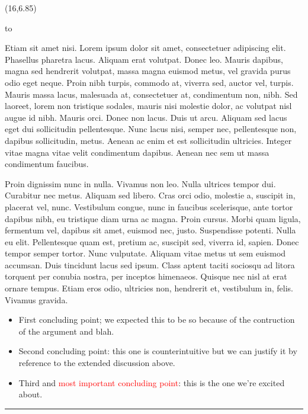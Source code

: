 \documentclass[a0]{a0poster}
\def\Head#1{\noindent\hbox to \hsize{\hfil{\LARGE\color{DarkBlue}\sf #1}}\bigskip}
\begin{document}
\begin{textblock}{7}(16,6.85)

\Head{Discussion and Conclusions}

\sf
Etiam sit amet nisi. Lorem ipsum dolor sit amet, consectetuer adipiscing elit. Phasellus pharetra lacus. Aliquam erat volutpat. Donec leo. Mauris dapibus, magna sed hendrerit volutpat, massa magna euismod metus, vel gravida purus odio eget neque. Proin nibh turpis, commodo at, viverra sed, auctor vel, turpis. Mauris massa lacus, malesuada at, consectetuer at, condimentum non, nibh. Sed laoreet, lorem non tristique sodales, mauris nisi molestie dolor, ac volutpat nisl augue id nibh. Mauris orci. Donec non lacus. Duis ut arcu. Aliquam sed lacus eget dui sollicitudin pellentesque. Nunc lacus nisi, semper nec, pellentesque non, dapibus sollicitudin, metus. Aenean ac enim et est sollicitudin ultricies. Integer vitae magna vitae velit condimentum dapibus. Aenean nec sem ut massa condimentum faucibus. 

Proin dignissim nunc in nulla. Vivamus non leo. Nulla ultrices tempor dui. Curabitur nec metus. Aliquam sed libero. Cras orci odio, molestie a, suscipit in, placerat vel, nunc. Vestibulum congue, nunc in faucibus scelerisque, ante tortor dapibus nibh, eu tristique diam urna ac magna. Proin cursus. Morbi quam ligula, fermentum vel, dapibus sit amet, euismod nec, justo. Suspendisse potenti. Nulla eu elit. Pellentesque quam est, pretium ac, suscipit sed, viverra id, sapien.
Donec tempor semper tortor. Nunc vulputate. Aliquam vitae metus ut sem euismod accumsan. Duis tincidunt lacus sed ipsum. Class aptent taciti sociosqu ad litora torquent per conubia nostra, per inceptos himenaeos. Quisque nec nisl at erat ornare tempus. Etiam eros odio, ultricies non, hendrerit et, vestibulum in, felis. Vivamus gravida. 

\begin{itemize}
\item First concluding point; we expected this to be so because of the contruction of the argument and blah. 
\item Second concluding point: this one is counterintuitive but we can justify it by reference to the extended discussion above.
\item Third and \textcolor{Red}{most important concluding point}: this is the one we're excited about.
\end{itemize}

\vspace*{4mm} %
\bigskip
\hrule
\end{textblock}
\end{document}
